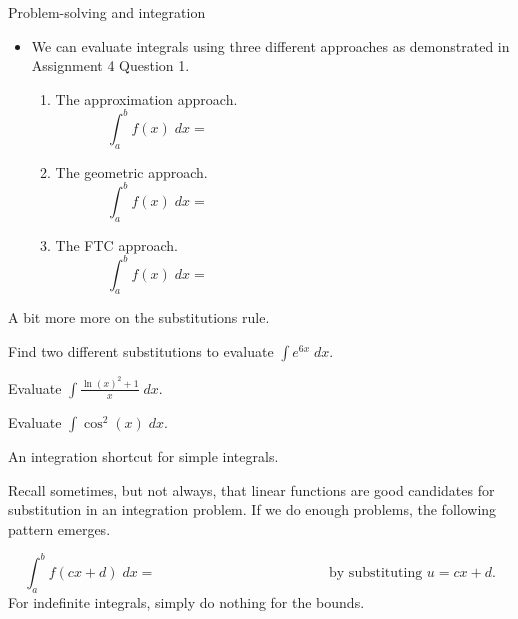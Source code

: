 \documentclass[../main.tex]{subfiles}
\begin{document}
\begin{lesson}{Problem-solving and integration}
\begin{enumerate}[wide, label=\textbf{Part~\arabic*}.]
\begin{itemize}
        \item We can evaluate integrals using three different approaches as demonstrated in Assignment 4 Question 1.

          \begin{enumerate}
            \item The approximation approach. 
              \[
                \int_{a}^{b} f(x) \;dx = \hspace{3in}
              \]

            \item The geometric approach. 
              \[
                \int_{a}^{b} f(x) \;dx = \hspace{3in}
              \]

            \item The FTC approach. 
              \[
                \int_{a}^{b} f(x) \;dx = \hspace{3in}
              \]
          \end{enumerate}
      \end{itemize}
  \end{enumerate}

  \clearpage
  A bit more more on the substitutions rule. 

  \begin{example}
    Find two different substitutions to evaluate \(\int e^{6x} \;dx\).
  \end{example}

  \begin{example}
    Evaluate \(\int \frac{\ln(x)^{2} + 1}{x} \;dx\).
  \end{example}

  \begin{example}
    Evaluate \(\int \cos^{2}(x) \;dx\).
  \end{example}

  \clearpage
  An integration shortcut for simple integrals.

  Recall sometimes, but not always, that linear functions are good candidates for substitution in an integration problem. If we do enough problems, the following pattern emerges.
  \begin{mdframed}[style=simple]
    \begin{equation} \label{eq:integration-affine-substitution}
      \int_{a}^{b} f(cx+ d) \;dx = \hspace{2in} \text{ by substituting } u = cx + d.
    \end{equation}
  For indefinite integrals, simply do nothing for the bounds. 
  \end{mdframed}
  

\end{lesson}
\end{document}
